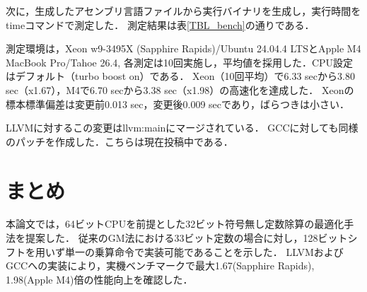\documentclass{jarticle}
\begin{document}
次に，生成したアセンブリ言語ファイルから実行バイナリを生成し，実行時間をtimeコマンドで測定した．
測定結果は表\ref{TBL_bench}の通りである．


測定環境は，Xeon w9-3495X (Sapphire Rapids)/Ubuntu 24.04.4 LTSとApple M4 MacBook Pro/Tahoe 26.4,
各測定は10回実施し，平均値を採用した．CPU設定はデフォルト（turbo boost on）である．
Xeon（10回平均）で6.33 secから3.80 sec（x1.67），M4で6.70 secから3.38 sec（x1.98）の高速化を達成した．
Xeonの標本標準偏差は変更前0.013 sec，変更後0.009 secであり，ばらつきは小さい．

LLVMに対するこの変更はllvm:mainにマージされている．
GCCに対しても同様のパッチを作成した\cite{GCCpatch}．こちらは現在投稿中である．

\section{まとめ}
本論文では，64ビットCPUを前提とした32ビット符号無し定数除算の最適化手法を提案した．
従来のGM法における33ビット定数の場合に対し，128ビットシフトを用いず単一の乗算命令で実装可能であることを示した．
LLVMおよびGCCへの実装により，実機ベンチマークで最大1.67(Sapphire Rapids), 1.98(Apple M4)倍の性能向上を確認した．



\end{document}
